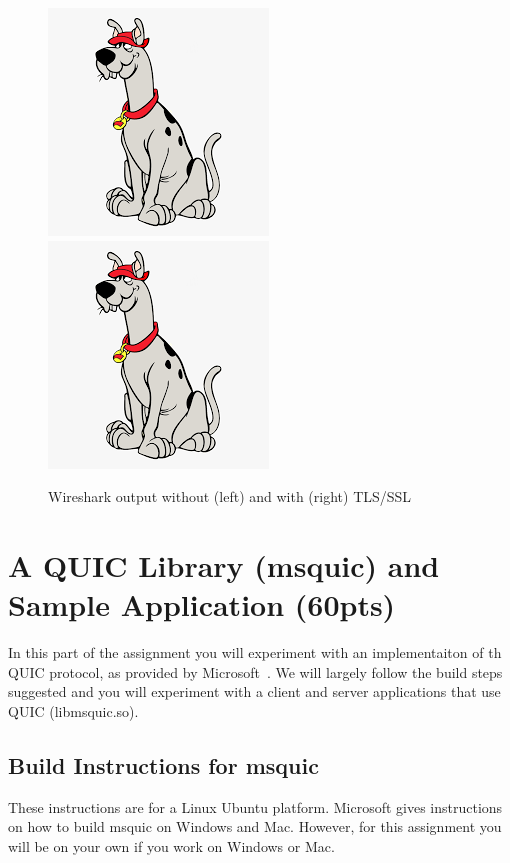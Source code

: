 \documentclass[11pt]{article}
\begin{document}
\begin{figure}[ht]
\includegraphics[width=.49\columnwidth]{dummy.png}
\includegraphics[width=.49\columnwidth]{dummy.png}
\caption{Wireshark output without (left) and with (right) TLS/SSL}
\label{fig:problem2}
\end{figure}



\section{A QUIC Library (msquic) and Sample Application (60pts)}
In this part of the assignment you will experiment with an implementaiton of th QUIC protocol, as provided by Microsoft~\cite{msquic}. We will largely follow the build steps suggested and you will experiment with a client and server applications that use QUIC (libmsquic.so).

\subsection{Build Instructions for msquic}
These instructions are for a Linux Ubuntu platform. Microsoft gives instructions on how to build msquic on Windows and Mac. However, for this assignment you will be on your own if you work on Windows or Mac.
\end{document}
